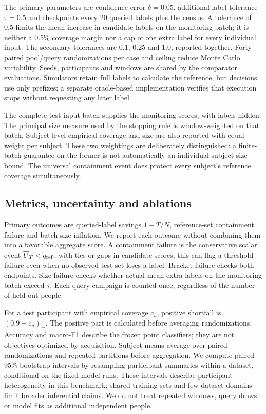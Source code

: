 \documentclass[pdflatex,sn-basic,Numbered,iicol]{sn-jnl}
\begin{document}
The primary parameters are confidence error $\delta=0.05$, additional-label tolerance $\tau=0.5$ and checkpoints every 20 queried labels plus the census. A tolerance of 0.5 limits the mean increase in candidate labels on the monitoring batch; it is neither a 0.5\% coverage margin nor a cap of one extra label for every individual input. The secondary tolerances are 0.1, 0.25 and 1.0, reported together. Forty paired pool/query randomizations per case and ceiling reduce Monte Carlo variability. Seeds, participants and windows are shared by the comparator evaluations. Simulators retain full labels to calculate the reference, but decisions use only prefixes; a separate oracle-based implementation verifies that execution stops without requesting any later label.

The complete test-input batch supplies the monitoring scores, with labels hidden. The principal size measure used by the stopping rule is window-weighted on that batch. Subject-level empirical coverage and size are also reported with equal weight per subject. These two weightings are deliberately distinguished: a finite-batch guarantee on the former is not automatically an individual-subject size bound. The universal containment event does protect every subject's reference coverage simultaneously.

\subsection{Metrics, uncertainty and ablations}
Primary outcomes are queried-label savings $1-T/N$, reference-set containment failure and batch size inflation. We report each outcome without combining them into a favorable aggregate score. A containment failure is the conservative scalar event $\overline U_T<q_{\rm ref}$; with ties or gaps in candidate scores, this can flag a threshold failure even when no observed test set loses a label. Bracket failure checks both endpoints. Size failure checks whether actual mean extra labels on the monitoring batch exceed $\tau$. Each query campaign is counted once, regardless of the number of held-out people.

For a test participant with empirical coverage $c_u$, positive shortfall is $(0.9-c_u)_+$. The positive part is calculated before averaging randomizations. Accuracy and macro-F1 describe the frozen point classifiers; they are not objectives optimized by acquisition. Subject means average over paired randomizations and repeated partitions before aggregation. We compute paired 95\% bootstrap intervals by resampling participant summaries within a dataset, conditional on the fixed model runs. These intervals describe participant heterogeneity in this benchmark; shared training sets and few dataset domains limit broader inferential claims. We do not treat repeated windows, query draws or model fits as additional independent people.
\end{document}
